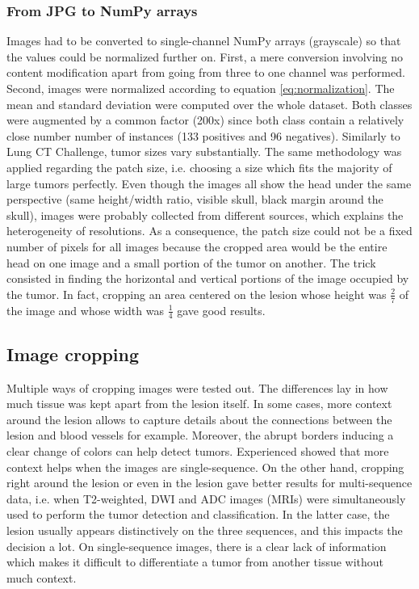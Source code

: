 \subsubsection{From JPG to NumPy arrays}
Images had to be converted to single-channel NumPy arrays (grayscale) so that the values could be normalized further on. First, a mere conversion involving no content modification apart from going from three to one channel was performed. Second, images were normalized according to equation \ref{eq:normalization}. The mean and standard deviation were computed over the whole dataset. Both classes were augmented by a common factor (200x) since both class contain a relatively close number number of instances (133 positives and 96 negatives). Similarly to Lung CT Challenge, tumor sizes vary substantially. The same methodology was applied regarding the patch size, i.e. choosing a size which fits the majority of large tumors perfectly. Even though the images all show the head under the same perspective (same height/width ratio, visible skull, black margin around the skull), images were probably collected from different sources, which explains the heterogeneity of resolutions. As a consequence, the patch size could not be a fixed number of pixels for all images because the cropped area would be the entire head on one image and a small portion of the tumor on another. The trick consisted in finding the horizontal and vertical portions of the image occupied by the tumor. In fact, cropping an area centered on the lesion whose height was $\frac{2}{7}$ of the image and whose width was $\frac{1}{4}$ gave good results. 


\subsection{Image cropping}
Multiple ways of cropping images were tested out. The differences lay in how much tissue was kept apart from the lesion itself. In some cases, more context around the lesion allows to capture details about the connections between the lesion and blood vessels for example. Moreover, the abrupt borders inducing a clear change of colors can help detect tumors. Experienced showed that more context helps when the images are single-sequence. On the other hand, cropping right around the lesion or even in the lesion gave better results for multi-sequence data, i.e. when T2-weighted, DWI and ADC images (MRIs) were simultaneously used to perform the tumor detection and classification. In the latter case, the lesion usually appears distinctively on the three sequences, and this impacts the decision a lot. On single-sequence images, there is a clear lack of information which makes it difficult to differentiate a tumor from another tissue without much context. 


